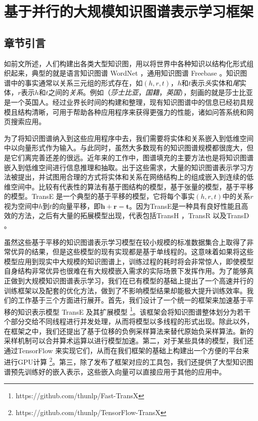 \chapter{基于并行的大规模知识图谱表示学习框架}
\label{cha2:framework}

\section{章节引言}

如前文所述，人们构建出各类大型知识图，用以将世界中各种知识以结构化形式组织起来，典型的就是语言知识图谱 WordNet \cite{miller1995wordnet}，通用知识图谱 Freebase \cite{bollacker2008freebase}。知识图谱中的事实通常以关系三元组的形式存在，如$(h, r, t)$，$h$和$t$表示\emph{头}实体和\emph{尾}实体，$r$表示$h$和$t$之间的\emph{关系}。例如（\emph{莎士比亚}，\emph{国籍}，\emph{英国}），刻画的就是莎士比亚是一个英国人。经过业界长时间的构建和整理，现有知识图谱中的信息已经初具规模且结构清晰，可用于帮助各种应用程序来获得更强力的性能，诸如问答系统和网页搜索应用。

为了将知识图谱纳入到这些应用程序中去，我们需要将实体和关系嵌入到低维空间中以向量形式作为输入。与此同时，虽然大多数现有的知识图谱规模都很庞大，但是它们离完善还差的很远。近年来的工作中，图谱填充的主要方法也是将知识图谱嵌入到低维空间进行信息推理和抽取。出于这些需求，大量的知识图谱表示学习方法被提出，并试图用合理的方式将实体和关系在网络结构上的组成嵌入到连续的低维空间中。比较有代表性的算法有基于图结构的模型\cite{lao2010relational,lao2011random}，基于张量的模型\cite{socher2013reasoning, nickel2016holographic}，基于平移的模型\cite{bordes2013translating,ji2015knowledge,ji2016knowledge}。TransE \cite{bordes2013translating}是一个典型的基于平移的模型，它将每个事实$(h,r,t)$中的关系$r$视为空间中$h$到$t$的向量平移，即$\textbf{h} + \textbf{r} = \textbf{t}$。因为TransE是一种具有良好性能且高效的方法，之后有大量的拓展模型出现，代表包括TransH \cite{wang2014transh}，TransR \cite{lin2015learning}以及TransD \cite{ji2015knowledge}。

虽然这些基于平移的知识图谱表示学习模型在较小规模的标准数据集合上取得了非常优异的结果，但是这些模型的现有实现都是基于单线程的。这意味着如果将这些模型应用到现实中大规模的知识图谱上，训练过程的耗时将会非常惊人，即使模型自身结构非常优异也很难在有大规模嵌入需求的实际场景下发挥作用。为了能够真正做到大规模知识图谱表示学习，我们在已有模型的基础上提出了一个高速并行的训练框架以及配套的优化方法，做到了不影响模型结果却能极大提升训练效率。我们的工作基于三个方面进行展开。首先，我们设计了一个统一的框架来加速基于平移的知识表示模型 TransE 及其扩展模型 \footnote{https://github.com/thunlp/Fast-TransX}。该框架会将知识图谱整体划分为若干个部分交给不同线程进行并发处理，从而将模型以多线程的形式出现。除此以外，在框架之中，我们还提出了基于位移的负例采样算法来替代原始负采样算法。新的采样机制可以合并算术运算以进行模型加速。第二，对于某些具体的模型，我们还通过TensorFlow \cite{Abadi2016TensorFlow}来实现它们，从而在我们框架的基础上构建出一个方便的平台来进行GPU计算 \footnote{https://github.com/thunlp/TensorFlow-TransX}。第三，除了发布了框架对应的工具包，我们还提供了大型知识图谱预先训练好的嵌入表示，这些嵌入向量可以直接应用于其他的应用中。

